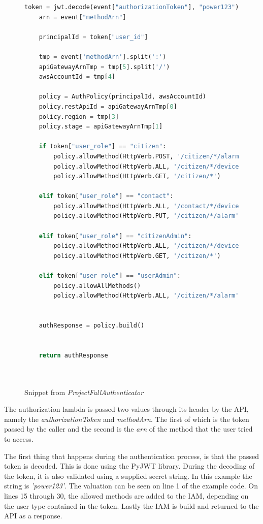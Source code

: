 \begin{figure}[H]
    \centering
    \begin{lstlisting}[language=Python]
    token = jwt.decode(event["authorizationToken"], "power123")
    arn = event["methodArn"]
    
    principalId = token["user_id"]

    tmp = event['methodArn'].split(':')
    apiGatewayArnTmp = tmp[5].split('/')
    awsAccountId = tmp[4]

    policy = AuthPolicy(principalId, awsAccountId)
    policy.restApiId = apiGatewayArnTmp[0]
    policy.region = tmp[3]
    policy.stage = apiGatewayArnTmp[1]
    
    if token["user_role"] == "citizen":
        policy.allowMethod(HttpVerb.POST, '/citizen/*/alarm')
        policy.allowMethod(HttpVerb.ALL, '/citizen/*/device')
        policy.allowMethod(HttpVerb.GET, '/citizen/*')
        
    elif token["user_role"] == "contact":
        policy.allowMethod(HttpVerb.ALL, '/contact/*/device')
        policy.allowMethod(HttpVerb.PUT, '/citizen/*/alarm')
        
    elif token["user_role"] == "citizenAdmin":
        policy.allowMethod(HttpVerb.ALL, '/citizen/*/device')
        policy.allowMethod(HttpVerb.GET, '/citizen/*')
        
    elif token["user_role"] == "userAdmin":
        policy.allowAllMethods()
        policy.allowMethod(HttpVerb.ALL, '/citizen/*/alarm')
    
    
    authResponse = policy.build()
 

    return authResponse
    
    
\end{lstlisting}
    \caption{Snippet from \textit{ProjectFallAuthenticator}}
    \label{fig:iam-auth}
\end{figure}

The authorization lambda is passed two values through its header by the API, namely the \textit{authorizationToken} and \textit{methodArn}. The first of which is the token passed by the caller and the second is the \textit{arn} of the method that the user tried to access. 

The first thing that happens during the authentication process, is that the passed token is decoded. This is done using the PyJWT library. During the decoding of the token, it is also validated using a supplied secret string. In this example the string is \textit{'power123'}. The valuation can be seen on line 1 of the example code. On lines 15 through 30, the allowed methods are added to the IAM, depending on the user type contained in the token. Lastly the IAM is build and returned to the API as a response.

